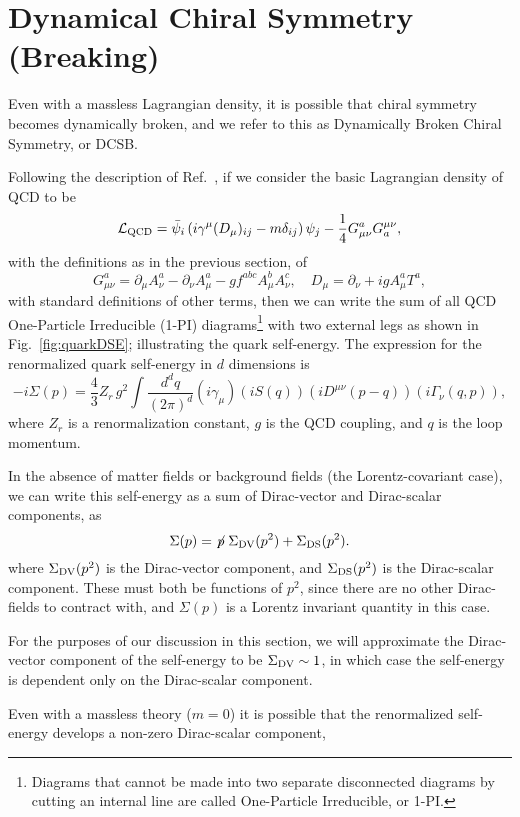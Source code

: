 \documentclass[11pt,a4paper,twoside]{carrollthesis}
\newcommand{\be}{\begin{equation}}
\newcommand{\ee}{\end{equation}}
\newcommand{\del}{\partial}
\newcommand{\reci}[1]{\frac{1}{#1}}
\newcommand{\pslash}{\mbox{$\not \! p$}}
\begin{document}
\section{Dynamical Chiral Symmetry (Breaking)}\label{sec:dynamicchiral}
%
Even with a massless Lagrangian density, it is possible that chiral
symmetry becomes dynamically broken, and we refer to this as
Dynamically Broken Chiral Symmetry, or DCSB.\par
%
Following the description of Ref.~\cite{Roberts:1994dr}, if we
consider the basic Lagrangian density of QCD to be
%
\be {\cal L}_{\rm QCD} = \bar{\psi}_i\left(i\gamma^\mu (D_\mu)_{ij} -
m \delta_{ij}\right) \psi_j - \reci{4}G_{\mu\nu}^aG^{\mu\nu}_a, \ee
%
with the definitions as in the previous section, of
%
\be
G^a_{\mu\nu} = \del_\mu A^a_\nu - \del_\nu A^a_\mu - g
f^{abc}A^b_\mu A^c_\nu, \quad 
D_\mu = \del_\nu + i g A^a_\mu T^a,%
\ee
%
with standard definitions of other terms, then we can write the sum of
all QCD One-Particle Irreducible (1-PI) diagrams\footnote{Diagrams
  that cannot be made into two separate disconnected diagrams by
  cutting an internal line are called One-Particle Irreducible, or
  1-PI.} with two external legs as shown in Fig.~\ref{fig:quarkDSE};
illustrating the quark self-energy. The expression for the
renormalized quark self-energy in $d$ dimensions is
%
\be \label{eq:quarkDSE} -i\Sigma(p) = \frac{4}{3}Z_r\, g^2 \! \int
\frac{d^d q}{(2\pi)^d}
(i\gamma_\mu)(iS(q))(iD^{\mu\nu}(p-q))(i\Gamma_\nu(q,p)), \ee
%
where $Z_r$ is a renormalization constant, $g$ is the QCD
coupling, and $q$ is the loop momentum.\par
%
In the absence of matter fields or background fields (the
Lorentz-covariant case), we can write this self-energy as a sum of
Dirac-vector and Dirac-scalar components, as
%
\be \label{eq:LcovSE} \Sigma(p) = \pslash\; \Sigma_{\rm DV}(p^2) +
\Sigma_{\rm DS}(p^2).  \ee
%
where $\Sigma_{\rm DV}(p^2)$ is the Dirac-vector component, and
$\Sigma_{\rm DS}(p^2)$ is the Dirac-scalar component. These must both
be functions of $p^2$, since there are no other Dirac-fields to
contract with, and $\Sigma(p)$ is a Lorentz invariant quantity in this
case.\par
%
For the purposes of our discussion in this section, we will
approximate the Dirac-vector component of the self-energy to be
$\Sigma_{\rm DV} \sim 1$, in which case the self-energy is dependent
only on the Dirac-scalar component.\par
%
Even with a massless theory ($m = 0$) it is possible that the
renormalized self-energy develops a non-zero Dirac-scalar component,
\end{document}
